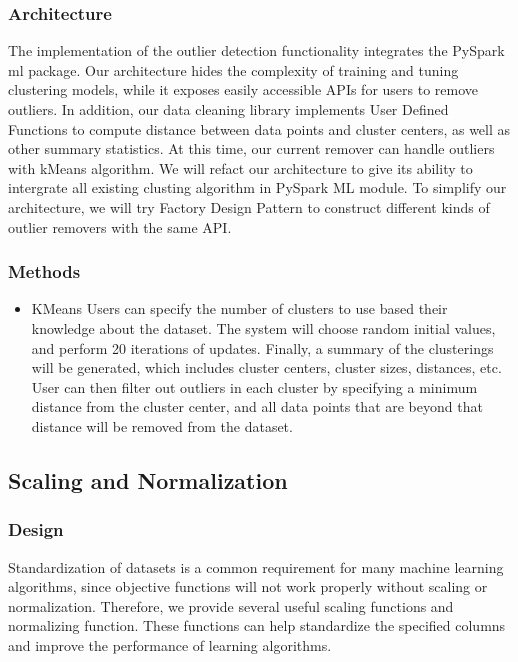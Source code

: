 \documentclass[sigconf]{acmart}
\begin{document}
\subsubsection{Architecture}
The implementation of the outlier detection functionality integrates the PySpark ml package. Our architecture hides the complexity of training and tuning clustering models, while it exposes easily accessible APIs for users to remove outliers. In addition, our data cleaning library implements User Defined Functions to compute distance between data points and cluster centers, as well as other summary statistics. At this time, our current remover can handle outliers with kMeans algorithm. We will refact our architecture to give its ability to intergrate all existing clusting algorithm in PySpark ML module. To simplify our architecture, we will try Factory Design Pattern to construct different kinds of outlier removers with the same API.

\subsubsection{Methods}
\begin{itemize}
	\item{KMeans}\cite{KMeans} Users can specify the number of clusters to use based their knowledge about the dataset. The system will choose random initial values, and perform 20 iterations of updates. Finally, a summary of the clusterings will be generated, which includes cluster centers, cluster sizes, distances, etc. User can then filter out outliers in each cluster by specifying a minimum distance from the cluster center, and all data points that are beyond that distance will be removed from the dataset.
\end{itemize}

\subsection{Scaling and Normalization}
\subsubsection{Design} 
Standardization of datasets is a common requirement for many machine learning algorithms, since objective functions will not work properly without scaling or normalization. Therefore, we provide several useful scaling functions and normalizing function. These functions can help standardize the  specified columns and improve the performance of learning algorithms.
\end{document}
